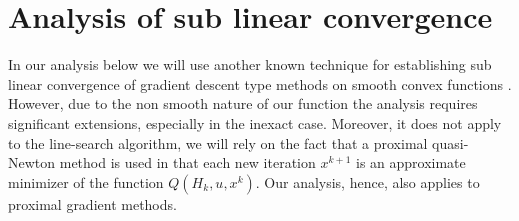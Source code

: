 \documentclass[11pt]{article}
\numberwithin{equation}{section}
\begin{document}
\section{Analysis of sub linear convergence}\label{sec:complete_conv}
In our analysis below we will use another known technique for establishing sub linear convergence of  gradient descent type methods
on smooth convex functions \cite{Cartisetal2012}. However, due to the non smooth nature of our function the analysis requires significant extensions,
especially in the inexact case. Moreover, it does not apply to the line-search algorithm, we will rely on the fact that a proximal quasi-Newton method is used in that each new iteration $x^{k+1}$ is an approximate minimizer of the function $Q(H_k, u, x^k)$. Our analysis, hence, also applies to proximal gradient methods. 
\end{document}
